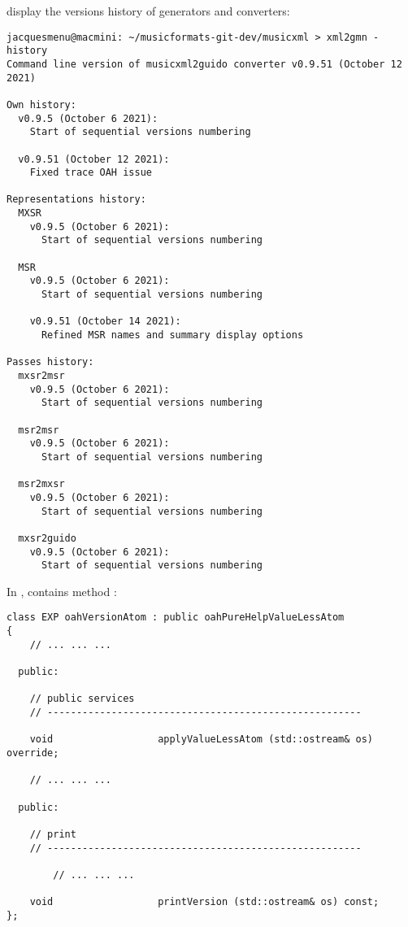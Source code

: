 display the versions history of generators and converters:
\begin{lstlisting}[language=Terminal]
jacquesmenu@macmini: ~/musicformats-git-dev/musicxml > xml2gmn -history
Command line version of musicxml2guido converter v0.9.51 (October 12 2021)

Own history:
  v0.9.5 (October 6 2021):
    Start of sequential versions numbering

  v0.9.51 (October 12 2021):
    Fixed trace OAH issue

Representations history:
  MXSR
    v0.9.5 (October 6 2021):
      Start of sequential versions numbering

  MSR
    v0.9.5 (October 6 2021):
      Start of sequential versions numbering

    v0.9.51 (October 14 2021):
      Refined MSR names and summary display options

Passes history:
  mxsr2msr
    v0.9.5 (October 6 2021):
      Start of sequential versions numbering

  msr2msr
    v0.9.5 (October 6 2021):
      Start of sequential versions numbering

  msr2mxsr
    v0.9.5 (October 6 2021):
      Start of sequential versions numbering

  mxsr2guido
    v0.9.5 (October 6 2021):
      Start of sequential versions numbering
\end{lstlisting}


In ,  contains method :
\begin{lstlisting}[language=CPlusPlus]
class EXP oahVersionAtom : public oahPureHelpValueLessAtom
{
	// ... ... ...

  public:

    // public services
    // ------------------------------------------------------

    void                  applyValueLessAtom (std::ostream& os) override;

	// ... ... ...

  public:

    // print
    // ------------------------------------------------------

		// ... ... ...

    void                  printVersion (std::ostream& os) const;
};
\end{lstlisting}

